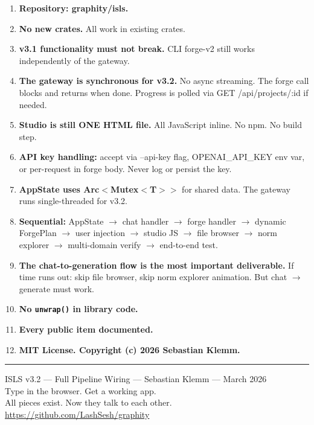 \documentclass[11pt,a4paper]{article}
\begin{document}
\begin{enumerate}
\item \textbf{Repository: graphity/isls.}
\item \textbf{No new crates.} All work in existing crates.
\item \textbf{v3.1 functionality must not break.} CLI forge-v2
  still works independently of the gateway.
\item \textbf{The gateway is synchronous for v3.2.} No async
  streaming. The forge call blocks and returns when done.
  Progress is polled via GET /api/projects/:id if needed.
\item \textbf{Studio is still ONE HTML file.} All JavaScript
  inline. No npm. No build step.
\item \textbf{API key handling:} accept via --api-key flag,
  OPENAI\_API\_KEY env var, or per-request in forge body.
  Never log or persist the key.
\item \textbf{AppState uses Arc$<$Mutex$<$T$>>$} for shared data.
  The gateway runs single-threaded for v3.2.
\item \textbf{Sequential:} AppState $\to$ chat handler $\to$
  forge handler $\to$ dynamic ForgePlan $\to$ user injection $\to$
  studio JS $\to$ file browser $\to$ norm explorer $\to$
  multi-domain verify $\to$ end-to-end test.
\item \textbf{The chat-to-generation flow is the most important
  deliverable.} If time runs out: skip file browser, skip
  norm explorer animation. But chat $\to$ generate must work.
\item \textbf{No \texttt{unwrap()} in library code.}
\item \textbf{Every public item documented.}
\item \textbf{MIT License. Copyright (c) 2026 Sebastian Klemm.}
\end{enumerate}

\vfill
\noindent\rule{\textwidth}{0.4pt}
\begin{center}
\small
ISLS v3.2 --- Full Pipeline Wiring --- Sebastian Klemm --- March 2026\\
Type in the browser. Get a working app.\\
All pieces exist. Now they talk to each other.\\
\url{https://github.com/LashSesh/graphity}
\end{center}
\end{document}

